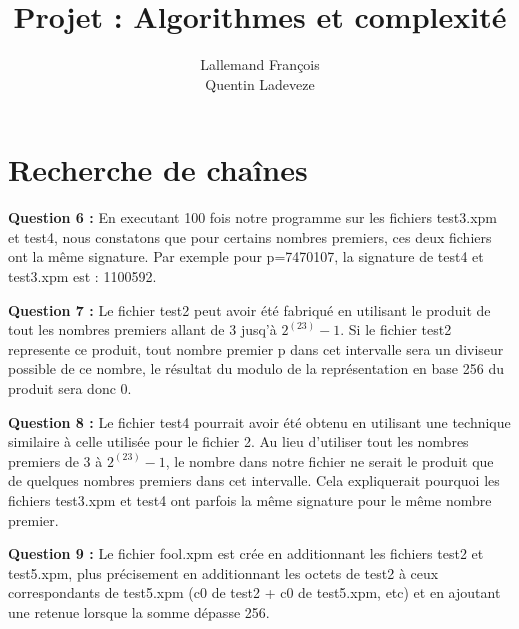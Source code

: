 \documentclass[a4paper, 11pt]{article}
\title{Projet : Algorithmes et complexité}
\author{Lallemand François\\Quentin Ladeveze}
\begin{document}
\maketitle


\section{Recherche de chaînes}
\textbf{Question 6 : }
En executant 100 fois notre programme sur les fichiers test3.xpm et test4, nous constatons que pour certains nombres premiers, ces deux fichiers ont la même signature. Par exemple pour p=7470107, la signature de test4 et test3.xpm est : 1100592.


\textbf{Question 7 : }
Le fichier test2 peut avoir été fabriqué en utilisant le produit de tout les nombres premiers allant de 3 jusq'à $2^{(23)}-1$.
Si le fichier test2 represente ce produit, tout nombre premier p dans cet intervalle sera un diviseur possible de ce nombre, le résultat du modulo de la représentation en base 256 du produit sera donc 0.

\textbf{Question 8 : }
Le fichier test4 pourrait avoir été obtenu en utilisant une technique similaire à celle utilisée pour le fichier 2.
Au lieu d'utiliser tout les nombres premiers de 3 à $2^{(23)}-1$, le nombre dans notre fichier ne serait le produit que de quelques nombres premiers dans cet intervalle. Cela expliquerait pourquoi les fichiers test3.xpm et test4 ont parfois la même signature pour le même nombre premier.


\textbf{Question 9 : }
Le fichier fool.xpm est crée en additionnant les fichiers test2 et test5.xpm, plus précisement en additionnant les octets de test2 à ceux correspondants de test5.xpm (c0 de test2 + c0 de test5.xpm, etc) et en
ajoutant une retenue lorsque la somme dépasse 256.
\end{document}
